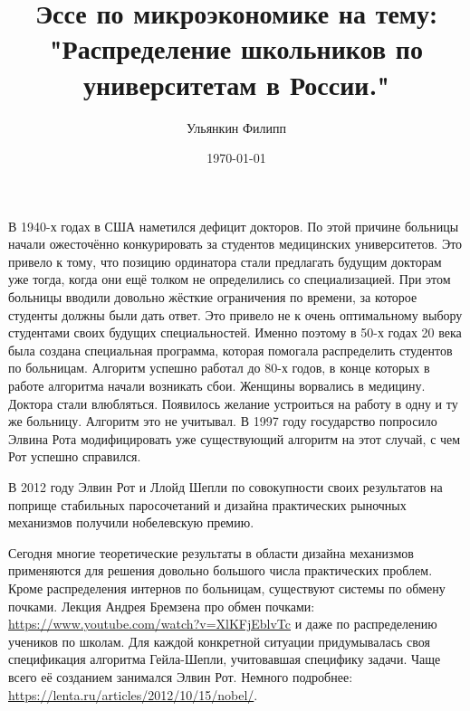 \documentclass[pdftex, 12pt, a4paper]{article}
\title{Эссе по микроэкономике на тему: \\ "Распределение школьников по университетам в России."}
\author{Ульянкин Филипп}
\date{\today}
\begin{document}
\maketitle





В 1940-х годах в США наметился дефицит докторов. По этой причине больницы начали ожесточённо конкурировать за студентов медицинских университетов. Это привело к тому, что позицию ординатора стали предлагать будущим докторам уже тогда, когда они ещё толком не определились со специализацией. При этом больницы вводили довольно жёсткие ограничения по времени, за которое студенты должны были дать ответ. Это привело не к очень оптимальному выбору студентами своих будущих специальностей. Именно поэтому в 50-х годах 20 века была создана специальная программа, которая помогала распределить студентов по больницам. Алгоритм успешно работал до 80-х годов, в конце которых в работе алгоритма начали возникать сбои. Женщины ворвались в медицину. Доктора стали влюбляться. Появилось желание устроиться на работу в одну и ту же больницу. Алгоритм это не учитывал. В 1997 году государство попросило Элвина Рота модифицировать уже существующий алгоритм на этот случай, с чем Рот успешно справился.  

В 2012 году Элвин Рот и Ллойд Шепли по совокупности своих результатов на поприще стабильных паросочетаний и дизайна практических рыночных механизмов получили нобелевскую премию. 


Сегодня многие теоретические результаты в области дизайна механизмов применяются для решения довольно большого числа практических проблем. Кроме распределения интернов по больницам, существуют системы по обмену почками. Лекция Андрея Бремзена про обмен почками: \url{https://www.youtube.com/watch?v=XlKFjEblvTc} и даже по распределению учеников по школам. Для каждой конкретной ситуации придумывалась своя спецификация алгоритма Гейла-Шепли, учитовавшая специфику задачи. Чаще всего её созданием занимался Элвин Рот. Немного подробнее: \url{https://lenta.ru/articles/2012/10/15/nobel/}. 
\end{document}
